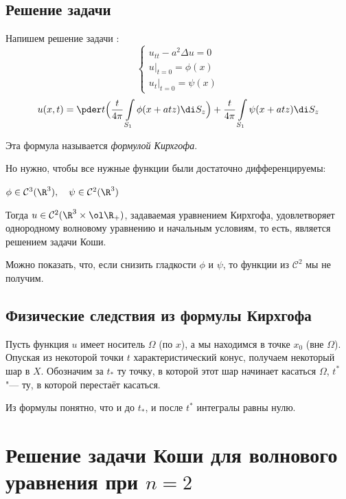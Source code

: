 \subsection{Решение задачи }

Напишем решение задачи :
$$
\begin{cases}
	u_{tt} - a^2 \Delta u = 0 \\
	u\bigr|_{t = 0} = \phi(x) \\
	u_t\bigr|_{t = 0} = \psi(x)
\end{cases} $$
$$ u(x, t) = \pder t \Bigl( \frac t{4\pi} \int\limits_{S_1} \phi(x + atz) \di S_z \Bigr) +
\frac t{4\pi} \int\limits_{S_1} \psi(x + atz) \di S_z $$

Эта формула называется \emph{формулой Кирхгофа}.

Но нужно, чтобы все нужные функции были достаточно дифференцируемы:

\begin{theorem}
	$ \phi \in \mathcal C^3(\R^3), \quad \psi \in \mathcal C^2(\R^3) $

	Тогда $ u \in \mathcal C^2(\R^3 \times \ol \R_+) $, задаваемая уравнением Кирхгофа,
	удовлетворяет однородному волновому уравнению и начальным условиям, то есть, является решением
	задачи Коши.
\end{theorem}

Можно показать, что, если снизить гладкости $ \phi $ и $ \psi $, то функции из $ \mathcal C^2 $ мы
не получим.

\subsection{Физические следствия из формулы Кирхгофа}

Пусть функция $ u $ имеет носитель $ \Omega $ (по $ x $), а мы находимся в точке $ x_0 $
(вне $ \Omega $).
Опуская из некоторой точки $ t $ характеристический конус, получаем некоторый шар в $ X $.
Обозначим за $ t_* $ ту точку, в которой этот шар начинает касаться $ \Omega $, $ t^* $ "--- ту,
в которой перестаёт касаться.

Из формулы понятно, что и до $ t_* $, и после $ t^* $ интегралы равны нулю.


\section{Решение задачи Коши для волнового уравнения при \texorpdfstring{$ n = 2 $}{n = 2}}


